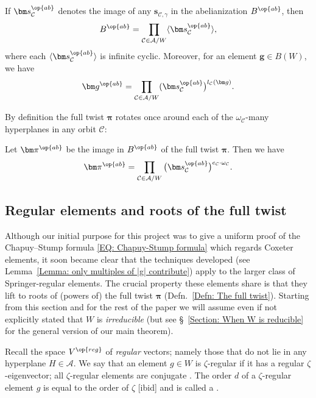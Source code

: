 \begin{theo}\label{Thm: The abelianization of B(W)}
If $\bm s_{\mathcal{C}}^{\op{ab}}$ denotes the image of any $\bm s_{\mathcal{C},\gamma}$ in the abelianization $B^{\op{ab}}$, then $$B^{\op{ab}}=\prod_{\mathcal{C}\in \mathcal{A}/W}\langle \bm s_{\mathcal{C}}^{\op{ab}}\rangle,$$ where each $\langle \bm s_{\mathcal{C}}^{\op{ab}}\rangle$ is infinite cyclic. Moreover, for an element $\bm g\in B(W)$, we have $$ \bm g^{\op{ab}}=\prod_{\mathcal{C}\in\mathcal{A}/W}(\bm s_{\mathcal{C}}^{\op{ab}}\big)^{l_{\mathcal{C}}(\bm g)}.$$ 
\end{theo}

\noindent By definition the full twist $\bm \pi$ rotates once around each of the $\omega_{\mathcal{C}}$-many hyperplanes in any orbit $\mathcal{C}$: 

\begin{coro}\label{Cor: the abelianization of the full twist}
Let $\bm \pi^{\op{ab}}$ be the image in $B^{\op{ab}}$ of the full twist $\bm \pi$. Then we have $$\bm\pi^{\op{ab}}=\prod_{\mathcal{C}\in\mathcal{A}/W}\big(\bm s_{\mathcal{C}}^{\op{ab}}\big)^{e_{\mathcal{C}}\cdot \omega_{\mathcal{C}}}.$$
\end{coro}



\subsection{Regular elements and roots of the full twist}
\label{Section:Regular elements and roots of the full twist}

Although our initial purpose for this project was to give a uniform proof of the Chapuy--Stump formula \eqref{EQ: Chapuy-Stump formula} which regards Coxeter elements, it soon became clear that the techniques developed (see Lemma~\ref{Lemma: only multiples of |g| contribute}) apply to the larger class of Springer-regular elements. The crucial property these elements share is that they lift to roots of (powers of) the full twist $\bm \pi$ (Defn.~\ref{Defn: The full twist}). Starting from this section and for the rest of the paper we will assume even if not explicitly stated that $W$ is \emph{irreducible} (but see \S~\ref{Section: When W is reducible} for the general version of our main theorem).

\begin{defi}\label{Defn: regular element}
Recall the space $V^{\op{reg}}$ of \emph{regular} vectors; namely those that do not lie in any hyperplane $H\in\mathcal{A}$. We say that an element $g\in W$ is {\color{blue} $\zeta$-regular} if it has a regular $\zeta$-eigenvector; all $\zeta$-regular elements are conjugate \cite[Corol.~11.25]{lehrer-taylor-book}. The order $d$ of a $\zeta$-regular element $g$ is equal to the order of $\zeta$ \textup{[ibid]} and is called a \emph{\color{blue}{regular number}}.
\end{defi}

